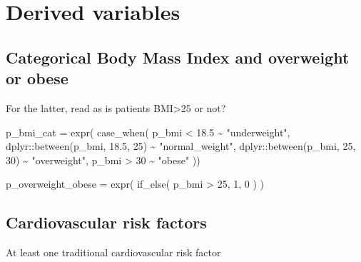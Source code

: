\documentclass[
]{book}
\newenvironment{Shaded}{\begin{snugshade}}{\end{snugshade}}
\newcommand{\DecValTok}[1]{\textcolor[rgb]{0.00,0.00,0.81}{#1}}
\newcommand{\FloatTok}[1]{\textcolor[rgb]{0.00,0.00,0.81}{#1}}
\newcommand{\FunctionTok}[1]{\textcolor[rgb]{0.00,0.00,0.00}{#1}}
\newcommand{\NormalTok}[1]{#1}
\newcommand{\OtherTok}[1]{\textcolor[rgb]{0.56,0.35,0.01}{#1}}
\newcommand{\SpecialCharTok}[1]{\textcolor[rgb]{0.00,0.00,0.00}{#1}}
\newcommand{\StringTok}[1]{\textcolor[rgb]{0.31,0.60,0.02}{#1}}
\begin{document}
\hypertarget{derived-variables}{%
\section{Derived variables}\label{derived-variables}}

\hypertarget{categorical-body-mass-index-and-overweight-or-obese}{%
\subsection{Categorical Body Mass Index and overweight or obese}\label{categorical-body-mass-index-and-overweight-or-obese}}

For the latter, read as is patients BMI\textgreater25 or not?

\begin{Shaded}
\begin{Highlighting}[]
\NormalTok{p\_bmi\_cat }\OtherTok{=} \FunctionTok{expr}\NormalTok{(}
  \FunctionTok{case\_when}\NormalTok{(}
\NormalTok{      p\_bmi }\SpecialCharTok{\textless{}} \FloatTok{18.5} \SpecialCharTok{\textasciitilde{}} \StringTok{"underweight"}\NormalTok{,}
\NormalTok{      dplyr}\SpecialCharTok{::}\FunctionTok{between}\NormalTok{(p\_bmi, }\FloatTok{18.5}\NormalTok{, }\DecValTok{25}\NormalTok{) }\SpecialCharTok{\textasciitilde{}} \StringTok{"normal\_weight"}\NormalTok{,}
\NormalTok{      dplyr}\SpecialCharTok{::}\FunctionTok{between}\NormalTok{(p\_bmi, }\DecValTok{25}\NormalTok{, }\DecValTok{30}\NormalTok{) }\SpecialCharTok{\textasciitilde{}} \StringTok{"overweight"}\NormalTok{,}
\NormalTok{      p\_bmi }\SpecialCharTok{\textgreater{}} \DecValTok{30} \SpecialCharTok{\textasciitilde{}} \StringTok{"obese"}
\NormalTok{    ))}

\NormalTok{p\_overweight\_obese }\OtherTok{=} \FunctionTok{expr}\NormalTok{(}
  \FunctionTok{if\_else}\NormalTok{(}
\NormalTok{      p\_bmi }\SpecialCharTok{\textgreater{}} \DecValTok{25}\NormalTok{, }
      \DecValTok{1}\NormalTok{, }
      \DecValTok{0}
\NormalTok{    )}
\NormalTok{)}
\end{Highlighting}
\end{Shaded}

\hypertarget{cardiovascular-risk-factors}{%
\subsection{Cardiovascular risk factors}\label{cardiovascular-risk-factors}}

At least one traditional cardiovascular risk factor
\end{document}
